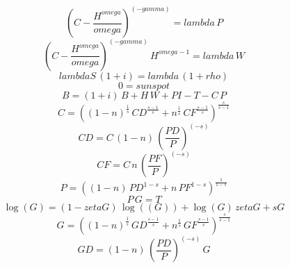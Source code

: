 \begin{dmath}
\left({C}-\frac{{H}^{{omega}}}{{omega}}\right)^{\left(-{gamma}\right)}={lambda}\, {P}
\end{dmath}
\begin{dmath}
\left({C}-\frac{{H}^{{omega}}}{{omega}}\right)^{\left(-{gamma}\right)}\, {H}^{{omega}-1}={lambda}\, {W}
\end{dmath}
\begin{dmath}
{lambdaS}\, \left(1+{i}\right)={lambda}\, \left(1+{rho}\right)
\end{dmath}
\begin{dmath}
0={sunspot}
\end{dmath}
\begin{dmath}
{B}=\left(1+{i}\right)\, {B}+{H}\, {W}+{PI}-{T}-{C}\, {P}
\end{dmath}
\begin{dmath}
{C}=\left(\left(1-{n}\right)^{\frac{1}{{s}}}\, {CD}^{\frac{{s}-1}{{s}}}+{n}^{\frac{1}{{s}}}\, {CF}^{\frac{{s}-1}{{s}}}\right)^{\frac{{s}}{{s}-1}}
\end{dmath}
\begin{dmath}
{CD}={C}\, \left(1-{n}\right)\, \left(\frac{{PD}}{{P}}\right)^{\left(-{s}\right)}
\end{dmath}
\begin{dmath}
{CF}={C}\, {n}\, \left(\frac{{PF}}{{P}}\right)^{\left(-{s}\right)}
\end{dmath}
\begin{dmath}
{P}=\left(\left(1-{n}\right)\, {PD}^{1-{s}}+{n}\, {PF}^{1-{s}}\right)^{\frac{1}{1-{s}}}
\end{dmath}
\begin{dmath}
{P}\, {G}={T}
\end{dmath}
\begin{dmath}
\log\left({G}\right)=\left(1-{zetaG}\right)\, \log\left(({G})\right)+\log\left({G}\right)\, {zetaG}+{sG}
\end{dmath}
\begin{dmath}
{G}=\left(\left(1-{n}\right)^{\frac{1}{{s}}}\, {GD}^{\frac{{s}-1}{{s}}}+{n}^{\frac{1}{{s}}}\, {GF}^{\frac{{s}-1}{{s}}}\right)^{\frac{{s}}{{s}-1}}
\end{dmath}
\begin{dmath}
{GD}=\left(1-{n}\right)\, \left(\frac{{PD}}{{P}}\right)^{\left(-{s}\right)}\, {G}
\end{dmath}
